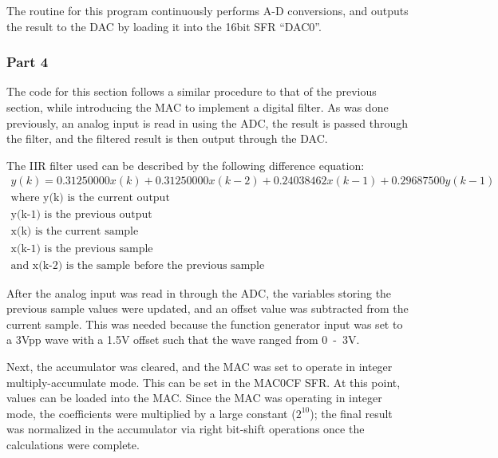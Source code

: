 \documentclass[12pt]{article}
\begin{document}
The routine for this program continuously performs A-D conversions, and  outputs the result to the DAC by loading it into the 16bit SFR ``DAC0''.

\subsubsection{Part 4}

The code for this section follows a similar procedure to that of the previous section, while introducing the MAC to implement a digital filter. As was done previously, an analog input is read in using the ADC, the result is passed through the filter, and the filtered result is then output through the DAC.

The IIR filter used can be described by the following difference equation:
\begin{gather*}
y(k) = 0.31250000x(k) + 0.31250000x(k-2) + 0.24038462x(k-1) + 0.29687500y(k-1)\\
\text{where y(k) is the current output}\\
\text{y(k-1) is the previous output}\\
\text{x(k) is the current sample}\\
\text{x(k-1) is the previous sample}\\
\text{and x(k-2) is the sample before the previous sample}
\end{gather*}

After the analog input was read in through the ADC, the variables storing the previous sample values were updated, and an offset value was subtracted from the current sample. This was needed because the function generator input was set to a \si{3}{Vpp} wave with a \si{\num{1.5}}{V} offset such that the wave ranged from \si{0-3}{V}.

Next, the accumulator was cleared, and the MAC was set to operate in integer multiply-accumulate mode. This can be set in the MAC0CF SFR. At this point, values can be loaded into the MAC. Since the MAC was operating in integer mode, the coefficients were multiplied by a large constant ($2^{10}$); the final result was normalized in the accumulator via right bit-shift operations once the calculations were complete.    
\end{document}
